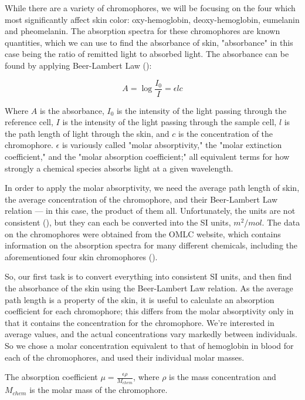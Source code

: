 While there are a variety of chromophores, we will be focusing on the four which most significantly affect skin color: oxy-hemoglobin, deoxy-hemoglobin, eumelanin and pheomelanin. The absorption spectra for these chromophores are known quantities, which we can use to find the absorbance of skin, "absorbance" in this case being the ratio of remitted light to absorbed light. The absorbance can be found by applying Beer-Lambert Law (\cite{Clark2007}):

\begin{equation}\label{eq:BeerLambert}
A = \log \frac{I_{0}}{I} = \epsilon l  c 
\end{equation}

Where $A$ is the absorbance, $I_{0}$ is the intensity of the light passing through the reference cell, $I$ is the intensity of the light passing through the sample cell, $l$ is the path length of light through the skin, and $c$ is the concentration of the chromophore. $\epsilon$ is variously called "molar absorptivity," the "molar extinction coefficient," and the "molar absorption coefficient;" all equivalent terms for how strongly a chemical species absorbs light at a given wavelength.

In order to apply the molar absorptivity, we need the average path length of skin, the average concentration of the chromophore, and their Beer-Lambert Law relation --- in this case, the product of them all. Unfortunately, the units are not consistent (\cite{Clark2007}), but they can each be converted into the SI units, $m^{2}/mol$. The data on the chromophores were obtained from the OMLC website, which contains information on the absorption spectra for many different chemicals, including the aforementioned four skin chromophores (\cite{OMLC2001}). 

So, our first task is to convert everything into consistent SI units, and then find the absorbance of the skin using the Beer-Lambert Law relation. As the average path length is a property of the skin, it is useful to calculate an absorption coefficient for each chromophore; this differs from the molar absorptivity only in that it contains the concentration for the chromophore. We're interested in average values, and the actual concentrations vary markedly between individuals. So we chose a molar concentration equivalent to that of hemoglobin in blood for each of the chromophores, and used their individual molar masses.

The absorption coefficient $\mu = \frac{\epsilon \rho}{M_{chem}}$, where $\rho$ is the mass concentration and $M_{chem}$ is the molar mass of the chromophore.

